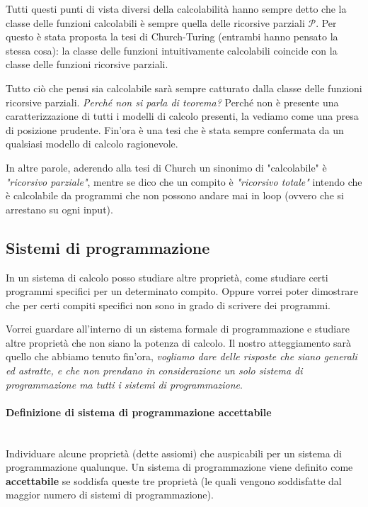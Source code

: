 \documentclass{article}
\begin{document}
Tutti questi punti di vista diversi della calcolabilità hanno sempre detto che la classe delle
funzioni calcolabili è sempre quella delle ricorsive parziali $\mathcal{P}$. Per questo
è stata proposta la tesi di Church-Turing (entrambi hanno pensato la stessa cosa): la classe
delle funzioni intuitivamente calcolabili coincide con la
classe delle funzioni ricorsive parziali.

Tutto ciò che pensi sia calcolabile sarà sempre catturato dalla classe delle funzioni ricorsive parziali.
\textit{Perché non si parla di teorema?} Perché non è presente una caratterizzazione di tutti
i modelli di calcolo presenti, la vediamo come una presa di posizione prudente. Fin'ora è
una tesi che è stata sempre confermata da un qualsiasi modello di calcolo ragionevole.

In altre parole, aderendo alla tesi di Church un sinonimo di "calcolabile" è \textit{"ricorsivo parziale"},
mentre se dico che un compito è \textit{"ricorsivo totale"} intendo che è calcolabile da programmi che
non possono andare mai in loop (ovvero che si arrestano su ogni input).

\subsection{Sistemi di programmazione}
In un sistema di calcolo posso studiare altre proprietà, come studiare certi programmi specifici
per un determinato compito. Oppure vorrei poter dimostrare che per certi compiti specifici non
sono in grado di scrivere dei programmi.

Vorrei guardare all'interno di un sistema formale di programmazione e studiare altre proprietà che
non siano la potenza di calcolo. Il nostro atteggiamento sarà quello che abbiamo tenuto fin'ora,
\textit{vogliamo dare delle risposte che siano generali ed astratte, e che non prendano in
    considerazione un solo sistema di programmazione ma tutti i sistemi di programmazione}.

\paragraph{Definizione di sistema di programmazione accettabile}\mbox{}\\
Individuare alcune proprietà (dette assiomi) che auspicabili per un sistema di programmazione
qualunque. Un sistema di programmazione viene definito come \textbf{accettabile} se soddisfa
queste tre proprietà (le quali vengono soddisfatte dal maggior numero di sistemi di programmazione).
\end{document}
